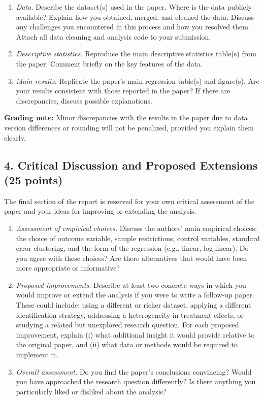\documentclass[letterpaper,12pt]{article}
\begin{document}
\begin{enumerate}[label=(\alph*)]
    \item \textit{Data.} Describe the dataset(s) used in the paper. Where is the data publicly available? Explain how you obtained, merged, and cleaned the data. Discuss any challenges you encountered in this process and how you resolved them. Attach all data cleaning and analysis code to your submission.

    \item \textit{Descriptive statistics.} Reproduce the main descriptive statistics table(s) from the paper. Comment briefly on the key features of the data.

    \item \textit{Main results.} Replicate the paper's main regression table(s) and figure(s). Are your results consistent with those reported in the paper? If there are discrepancies, discuss possible explanations.

\end{enumerate}

\noindent \textbf{Grading note:} Minor discrepancies with the results in the paper due to data version differences or rounding will not be penalized, provided you explain them clearly.

\subsection*{4. \quad Critical Discussion and Proposed Extensions (25 points)}

The final section of the report is reserved for your own critical assessment of the paper and your ideas for improving or extending the analysis.

\begin{enumerate}[label=(\alph*)]
    \item \textit{Assessment of empirical choices.} Discuss the authors' main empirical choices: the choice of outcome variable, sample restrictions, control variables, standard error clustering, and the form of the regression (e.g., linear, log-linear). Do you agree with these choices? Are there alternatives that would have been more appropriate or informative?

    \item \textit{Proposed improvements.} Describe at least two concrete ways in which you would improve or extend the analysis if you were to write a follow-up paper. These could include: using a different or richer dataset, applying a different identification strategy, addressing a heterogeneity in treatment effects, or studying a related but unexplored research question. For each proposed improvement, explain (i) what additional insight it would provide relative to the original paper, and (ii) what data or methods would be required to implement it.

    \item \textit{Overall assessment.} Do you find the paper's conclusions convincing? Would you have approached the research question differently? Is there anything you particularly liked or disliked about the analysis?
\end{enumerate}
\end{document}
